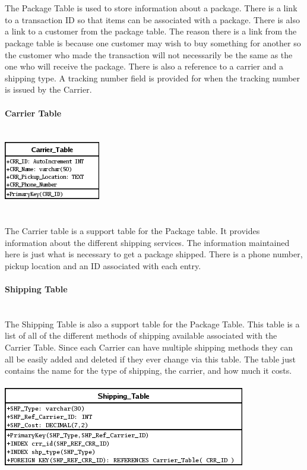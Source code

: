 \documentclass{report}
\begin{document}
    \\
    \\
    The Package Table is used to store information about a package. There is a link to a transaction ID
    so that items can be associated with a package. There is also a link to a customer from the package
    table. The reason there is a link from the package table is because one customer may wish to buy
    something for another so the customer who made the transaction will not necessarily be the same as
    the one who will receive the package. There is also a reference to a carrier and a shipping type.
    A tracking number field is provided for when the tracking number is issued by the Carrier.
    \\
    \\
    {\bf Carrier Table}\\
    \\
    \\
    \includegraphics{Tables/CarrierTable.png}\\
    \\
    \\
    The Carrier table is a support table for the Package table. It provides information about the different
    shipping services. The information maintained here is just what is necessary to get a package shipped.
    There is a phone number, pickup location and an ID associated with each entry.
    \\
    \\
    {\bf Shipping Table}\\
    \\
    \\
    The Shipping Table is also a support table for the Package Table. This table is a list of all of the
    different methods of shipping available associated with the Carrier Table. Since each Carrier can
    have multiple shipping methods they can all be easily added and deleted if they ever change via
    this table. The table just contains the name for the type of shipping, the carrier, and how much
    it costs.\\
    \\
    \includegraphics{Tables/ShippingTable.png}\\
    \\
\end{document}
